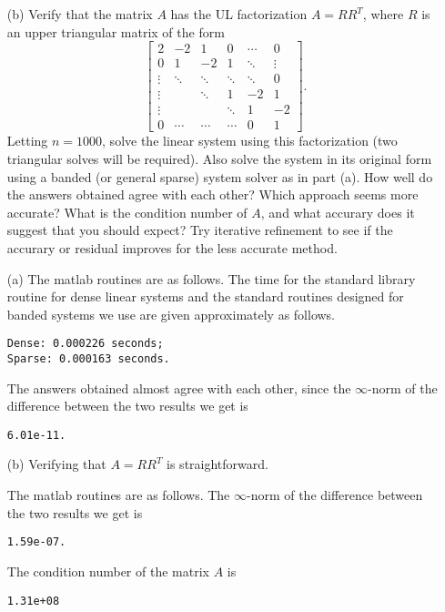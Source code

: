 \begin{pro}
\begin{itemize}
  \item[(b)]
    Verify that the matrix $A$ has the UL factorization $A = RR^T$,
    where $R$ is an upper triangular matrix of the form
    \begin{displaymath}
      \begin{bmatrix}
        2 & -2 & 1 & 0 & \cdots & 0 \\
        0 & 1 & -2 & 1 & \ddots & \vdots \\
        \vdots & \ddots & \ddots & \ddots & \ddots & 0 \\
        \vdots & & \ddots & 1 & -2 & 1 \\
        \vdots & & & \ddots & 1 & -2 \\
        0 & \cdots & \cdots & \cdots & 0 & 1
      \end{bmatrix}.
    \end{displaymath}
    Letting $n=1000$,
    solve the linear system using this factorization
    (two triangular solves will be required).
    Also solve the system in its original form using a banded (or general sparse) system solver
    as in part (a).
    How well do the answers obtained agree with each other?
    Which approach seems more accurate?
    What is the condition number of $A$,
    and what accurary does it suggest that you should expect?
    Try iterative refinement to see if the accurary  or residual improves
    for the less accurate method.
  \end{itemize}
\end{pro}

\begin{sol}
    \begin{itemize}
    \item[(a)]
      The matlab routines are as follows.
      The time for the standard library routine for dense linear systems and
      the standard routines designed for banded systems we use
      are given approximately as follows.
\begin{verbatim}
Dense: 0.000226 seconds;
Sparse: 0.000163 seconds.
\end{verbatim}
      The answers obtained almost agree with each other, 
      since the $\infty$-norm of the difference between the two results we get is
\begin{verbatim}
6.01e-11.
\end{verbatim}
  
  

  \item[(b)]
    Verifying that $A = RR^T$ is straightforward.

      The matlab routines are as follows.
      The $\infty$-norm of the difference between the two results we get is
\begin{verbatim}
1.59e-07.
\end{verbatim}
      The condition number of the matrix $A$ is
\begin{verbatim}
1.31e+08
\end{verbatim}
  
  \end{itemize}
\end{sol}
